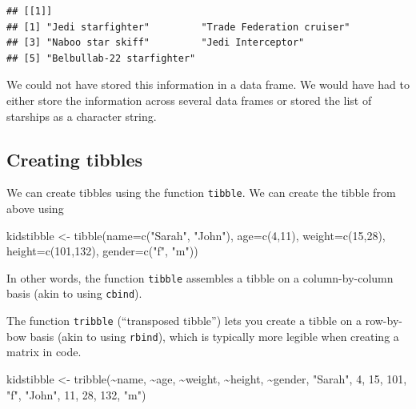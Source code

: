 \documentclass[
]{book}
\newenvironment{Shaded}{\begin{snugshade}}{\end{snugshade}}
\newcommand{\AttributeTok}[1]{\textcolor[rgb]{0.77,0.63,0.00}{#1}}
\newcommand{\DecValTok}[1]{\textcolor[rgb]{0.00,0.00,0.81}{#1}}
\newcommand{\FunctionTok}[1]{\textcolor[rgb]{0.00,0.00,0.00}{#1}}
\newcommand{\NormalTok}[1]{#1}
\newcommand{\OtherTok}[1]{\textcolor[rgb]{0.56,0.35,0.01}{#1}}
\newcommand{\SpecialCharTok}[1]{\textcolor[rgb]{0.00,0.00,0.00}{#1}}
\newcommand{\StringTok}[1]{\textcolor[rgb]{0.31,0.60,0.02}{#1}}
\begin{document}
\begin{verbatim}
## [[1]]
## [1] "Jedi starfighter"         "Trade Federation cruiser"
## [3] "Naboo star skiff"         "Jedi Interceptor"        
## [5] "Belbullab-22 starfighter"
\end{verbatim}

We could not have stored this information in a data frame. We would have had to either store the information across several data frames or stored the list of starships as a character string.

\hypertarget{creating-tibbles}{%
\subsection{Creating tibbles}\label{creating-tibbles}}

We can create tibbles using the function \texttt{tibble}. We can create the tibble from above using

\begin{Shaded}
\begin{Highlighting}[]
\NormalTok{kidstibble }\OtherTok{\textless{}{-}} \FunctionTok{tibble}\NormalTok{(}\AttributeTok{name=}\FunctionTok{c}\NormalTok{(}\StringTok{"Sarah"}\NormalTok{, }\StringTok{"John"}\NormalTok{), }\AttributeTok{age=}\FunctionTok{c}\NormalTok{(}\DecValTok{4}\NormalTok{,}\DecValTok{11}\NormalTok{), }\AttributeTok{weight=}\FunctionTok{c}\NormalTok{(}\DecValTok{15}\NormalTok{,}\DecValTok{28}\NormalTok{),}
                     \AttributeTok{height=}\FunctionTok{c}\NormalTok{(}\DecValTok{101}\NormalTok{,}\DecValTok{132}\NormalTok{), }\AttributeTok{gender=}\FunctionTok{c}\NormalTok{(}\StringTok{"f"}\NormalTok{, }\StringTok{"m"}\NormalTok{))}
\end{Highlighting}
\end{Shaded}

In other words, the function \texttt{tibble} assembles a tibble on a column-by-column basis (akin to using \texttt{cbind}).

The function \texttt{tribble} (``transposed tibble'') lets you create a tibble on a row-by-bow basis (akin to using \texttt{rbind}), which is typically more legible when creating a matrix in code.

\begin{Shaded}
\begin{Highlighting}[]
\NormalTok{kidstibble }\OtherTok{\textless{}{-}} \FunctionTok{tribble}\NormalTok{(}\SpecialCharTok{\textasciitilde{}}\NormalTok{name,   }\SpecialCharTok{\textasciitilde{}}\NormalTok{age, }\SpecialCharTok{\textasciitilde{}}\NormalTok{weight, }\SpecialCharTok{\textasciitilde{}}\NormalTok{height, }\SpecialCharTok{\textasciitilde{}}\NormalTok{gender,}
                      \StringTok{"Sarah"}\NormalTok{,    }\DecValTok{4}\NormalTok{,      }\DecValTok{15}\NormalTok{,     }\DecValTok{101}\NormalTok{,     }\StringTok{"f"}\NormalTok{,}
                      \StringTok{"John"}\NormalTok{,    }\DecValTok{11}\NormalTok{,      }\DecValTok{28}\NormalTok{,     }\DecValTok{132}\NormalTok{,     }\StringTok{"m"}\NormalTok{)}
\end{Highlighting}
\end{Shaded}
\end{document}
